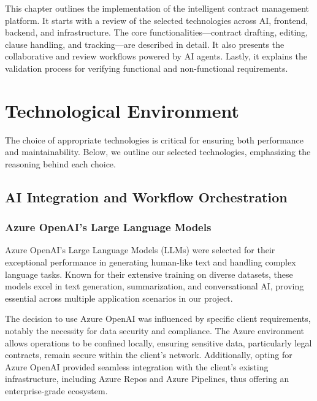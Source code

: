 This chapter outlines the implementation of the intelligent contract management platform. It starts with a review of the selected technologies across AI, frontend, backend, and infrastructure. The core functionalities—contract drafting, editing, clause handling, and tracking—are described in detail. It also presents the collaborative and review workflows powered by AI agents. Lastly, it explains the validation process for verifying functional and non-functional requirements.

\newpage
{}
\hypertarget{fourthchapter}{}

\section{Technological Environment}
The choice of appropriate technologies is critical for ensuring both performance and maintainability. Below, we outline our selected technologies, emphasizing the reasoning behind each choice.

\subsection{AI Integration and Workflow Orchestration}

\subsubsection{Azure OpenAI's Large Language Models}
Azure OpenAI's Large Language Models (LLMs) were selected for their exceptional performance in generating human-like text and handling complex language tasks. Known for their extensive training on diverse datasets, these models excel in text generation, summarization, and conversational AI, proving essential across multiple application scenarios in our project.\mynewline

The decision to use Azure OpenAI was influenced by specific client requirements, notably the necessity for data security and compliance. The Azure environment allows operations to be confined locally, ensuring sensitive data, particularly legal contracts, remain secure within the client's network. Additionally, opting for Azure OpenAI provided seamless integration with the client's existing infrastructure, including Azure Repos and Azure Pipelines, thus offering an enterprise-grade ecosystem.\mynewline

